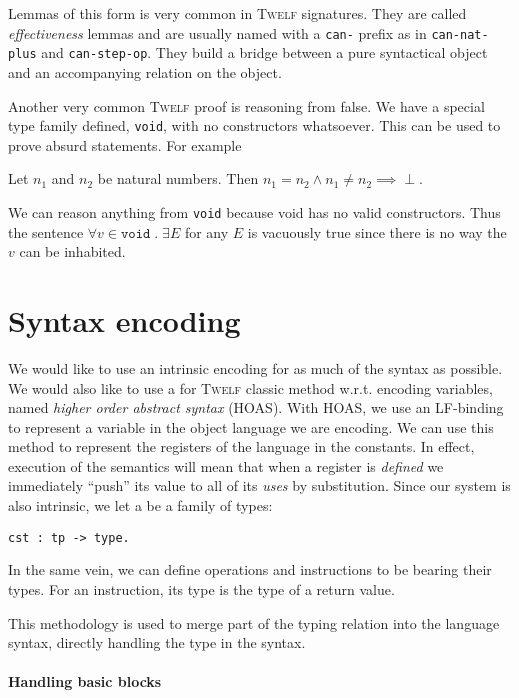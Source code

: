 \documentclass[a4paper, oneside, 10pt, final]{memoir}
\newcommand{\twelf}{\textsc{Twelf}}
\newcommand{\bottom}{\perp}
\begin{document}
Lemmas of this form is very common in \twelf{} signatures. They are
called \emph{effectiveness} lemmas and are usually named with a
\texttt{can-} prefix as in \texttt{can-nat-plus} and
\texttt{can-step-op}. They build a bridge between a pure syntactical
object and an accompanying relation on the object.

Another very common \twelf{} proof is reasoning from false. We have a
special type family defined, \texttt{void}, with no constructors
whatsoever. This can be used to prove absurd statements. For example
\begin{lem}
  Let $n_1$ and $n_2$ be natural numbers. Then $n_1 = n_2 \land n_1
  \neq n_2 \implies \bottom$.
\end{lem}

We can reason anything from \texttt{void} because void has no valid
constructors. Thus the sentence $\forall v \in \texttt{void} \; . \; \exists
E$ for any $E$ is vacuously true since there is no way the $v$ can be
inhabited.

\section{Syntax encoding}

We would like to use an intrinsic encoding for as much of the syntax
as possible. We would also like to use a for \twelf{} classic method
w.r.t. encoding variables, named \emph{higher order abstract syntax}
(HOAS). With HOAS, we use an LF-binding to represent a variable in the
object language we are encoding. We can use this method to represent
the registers of the language in the constants. In effect, execution
of the semantics will mean that when a register is \emph{defined} we
immediately ``push'' its value to all of its \emph{uses} by
substitution. Since our system is also intrinsic, we let a be a family
of types:
\begin{verbatim}
cst : tp -> type.
\end{verbatim}
In the same vein, we can define operations and instructions to be
bearing their types. For an instruction, its type is the type of a
return value.

This methodology is used to merge part of the typing relation into the
language syntax, directly handling the type in the syntax.

\paragraph{Handling basic blocks}
\end{document}
